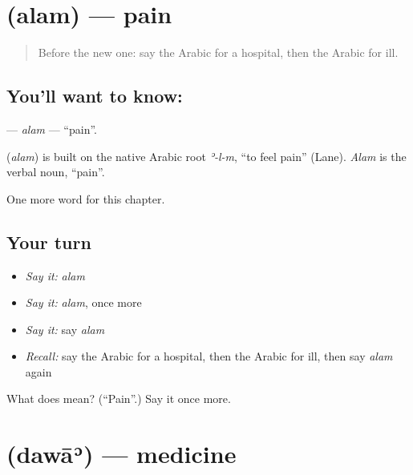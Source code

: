 \section[\texorpdfstring{\ar{ألم} (alam)}{ألم (alam)}]{ (alam) — pain}

\label{lesson:AR-C53-alam}



\begin{quote}
Before the new one: say the Arabic for a hospital, then the Arabic for ill.
\end{quote}

\subsection*{You'll want to know: }
\textbf{} — \emph{alam} — \textquotedblleft{}pain\textquotedblright{}.

\begin{cousinweb}
\textbf{} (\emph{alam}) is built on the native Arabic root \emph{ʾ-l-m}, \textquotedblleft{}to feel pain\textquotedblright{} (Lane). \emph{Alam} is the verbal noun, \textquotedblleft{}pain\textquotedblright{}.
\end{cousinweb}

\begin{grammarlens}[title={What you've built}]
One more word for this chapter.
\end{grammarlens}

\subsection*{Your turn}
\begin{itemize}
\raggedright
  \item \emph{Say it:} \emph{alam}
  \item \emph{Say it:} \emph{alam}, once more
  \item \emph{Say it:} say \emph{alam}
  \item \emph{Recall:} say the Arabic for a hospital, then the Arabic for ill, then say \emph{alam} again
\end{itemize}

\begin{tcolorbox}[breakable,colback=teal!4,colframe=teal!35!black,title={Before you move on}]
What does  mean? (\textquotedblleft{}Pain\textquotedblright{}.) Say it once more.
\end{tcolorbox}
\section[\texorpdfstring{\ar{دواء} (dawāʾ)}{دواء (dawāʾ)}]{ (dawāʾ) — medicine}

